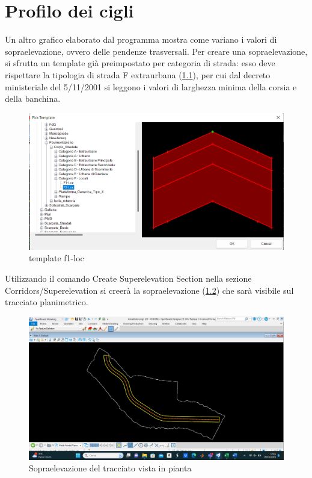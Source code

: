 \chapter{Profilo dei cigli}

Un altro grafico elaborato dal programma mostra come variano i valori di sopraelevazione, ovvero delle pendenze trasversali. Per creare una sopraelevazione, si sfrutta un template già preimpostato per categoria di strada: esso deve rispettare la tipologia di strada F extraurbana (\ref{template}), per cui dal decreto ministeriale del 5/11/2001 si leggono i valori di larghezza minima della corsia e della banchina.

\begin{figure}[H]
    \includegraphics[width=\textwidth]{Figures/template.png}
      \caption{template f1-loc}
      \label{template}
\end{figure}

Utilizzando il comando Create Superelevation Section nella sezione Corridors/Superelevation si creerà la sopraelevazione (\ref{Sopraelevazione}) che sarà visibile sul tracciato planimetrico.

\begin{figure}[H]
    \includegraphics[width=\textwidth]{Figures/Sopraelevazione del tracciato vista in pianta.png}
      \caption{Sopraelevazione del tracciato vista in pianta}
      \label{Sopraelevazione}
\end{figure}


